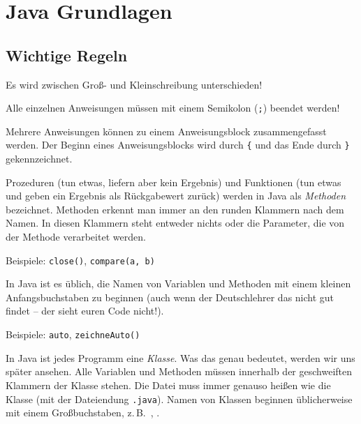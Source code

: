 \chapter{Java Grundlagen}
\renewcommand{\chaptertitle}{Java Grundlagen}

\lehead[]{\normalfont\sffamily\hspace*{-2.00cm}\textcolor{white}{\colorbox{lightblue}{\makebox[1.60cm][r]{\thechapter}}}\hspace{0.17cm}\textcolor{lightblue}{\chaptertitle}}
\rohead[]{\textcolor{lightblue}{\chaptertitle}\normalfont\sffamily\hspace*{0.17cm}\textcolor{white}{\colorbox{lightblue}{\makebox[1.60cm][l]{\thechapter}}}\hspace{-2.00cm}}
\rehead[]{\textcolor{lightblue}{AvHG, Inf, My}}
\lohead[]{\textcolor{lightblue}{AvHG, Inf, My}}

\lstset{style=myJava}


\section{Wichtige Regeln}

\begin{compactitem}
\item Es wird zwischen Groß- und Kleinschreibung unterschieden!

\item Alle einzelnen Anweisungen müssen mit einem Semikolon (\lstinline|;|) beendet werden!

\item Mehrere Anweisungen können zu einem Anweisungsblock zusammengefasst
werden. Der Beginn eines Anweisungsblocks wird durch \lstinline|{| und das Ende
durch \lstinline|}| gekennzeichnet.

\item Prozeduren (tun etwas, liefern aber kein Ergebnis) und Funktionen (tun
etwas und geben ein Ergebnis als Rückgabewert zurück) werden in Java als
\emph{Methoden} bezeichnet. Methoden erkennt man immer an den runden Klammern
nach dem Namen. In diesen Klammern steht entweder nichts oder die Parameter, die
von der Methode verarbeitet werden.

Beispiele: \lstinline|close()|, \lstinline|compare(a, b)|

\item In Java ist es üblich, die Namen von Variablen und Methoden mit einem
kleinen Anfangsbuchstaben zu beginnen (auch wenn der Deutschlehrer das nicht
gut findet -- der sieht euren Code nicht!).

Beispiele: \lstinline|auto|, \lstinline|zeichneAuto()|

\item In Java ist jedes Programm eine \emph{Klasse}. Was das genau bedeutet,
werden wir uns später ansehen. Alle Variablen und Methoden müssen innerhalb der
geschweiften Klammern der Klasse stehen. Die Datei muss immer genauso
heißen wie die Klasse (mit der Dateiendung \texttt{.java}). Namen von Klassen
beginnen üblicherweise mit einem Großbuchstaben, z.\,B.\ ,
.
\end{compactitem}


